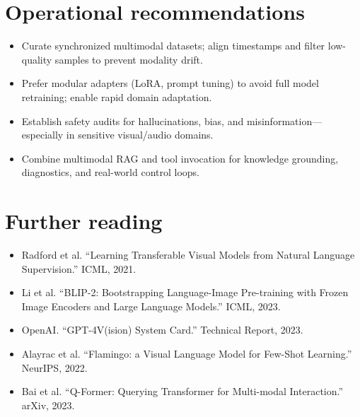 \documentclass{article}
\begin{document}
\section*{Operational recommendations}
\begin{itemize}
  \item Curate synchronized multimodal datasets; align timestamps and filter low-quality samples to prevent modality drift.
  \item Prefer modular adapters (LoRA, prompt tuning) to avoid full model retraining; enable rapid domain adaptation.
  \item Establish safety audits for hallucinations, bias, and misinformation—especially in sensitive visual/audio domains.
  \item Combine multimodal RAG and tool invocation for knowledge grounding, diagnostics, and real-world control loops.
\end{itemize}

\section*{Further reading}
\begin{itemize}
  \item Radford et al. ``Learning Transferable Visual Models from Natural Language Supervision.'' ICML, 2021.
  \item Li et al. ``BLIP-2: Bootstrapping Language-Image Pre-training with Frozen Image Encoders and Large Language Models.'' ICML, 2023.
  \item OpenAI. ``GPT-4V(ision) System Card.'' Technical Report, 2023.
  \item Alayrac et al. ``Flamingo: a Visual Language Model for Few-Shot Learning.'' NeurIPS, 2022.
  \item Bai et al. ``Q-Former: Querying Transformer for Multi-modal Interaction.'' arXiv, 2023.
\end{itemize}
\end{document}
